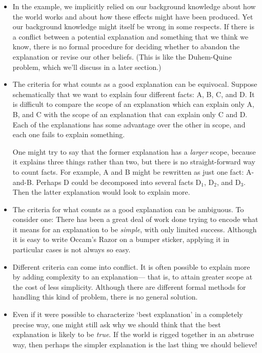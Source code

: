 \documentclass[]{article}
\begin{document}
\begin{itemize}
\item
In the example, we implicitly relied on our background knowledge about how the world works and about how these effects might have been produced. Yet our background knowledge might itself be wrong in some respects. If there is a conflict between a potential explanation and something that we think we know, there is no formal procedure for deciding whether to abandon the explanation or revise our other beliefs. (This is like the Duhem-Quine problem, which we'll discuss in a later section.)
\item
The criteria for what counts as a good explanation can be equivocal. Suppose schematically that we want to explain four different facts: A, B, C, and D. It is difficult to compare the scope of an explanation which can explain only A, B, and C with the scope of an explanation that can explain only C and D. Each of the explanations has some advantage over the other in scope, and each one fails to explain something.

One might try to say that the former explanation has a \emph{larger} scope, because it explains three things rather than two, but there is no straight-forward way to count facts. For example, A and B might be rewritten as just one fact: A-and-B. Perhaps D could be decomposed into several facts D$_{1}$, D$_{2}$, and D$_{3}$. Then the latter explanation would look to explain more.
\item
The criteria for what counts as a good explanation can be ambiguous. To consider one: There has been a great deal of work done trying to encode what it means for an explanation to be \emph{simple}, with only limited success. Although it is easy to write Occam's Razor on a bumper sticker, applying it in particular cases is not always so easy.
\item
Different criteria can come into conflict. It is often possible to explain more by adding complexity to an explanation--- that is, to attain greater scope at the cost of less simplicity. Although there are different formal methods for handling this kind of problem, there is no general solution.
\item
Even if it were possible to characterize `best explanation' in a completely precise way, one might still ask why we should think that the best explanation is likely to be \emph{true}. If the world is rigged together in an abstruse way, then perhaps the simpler explanation is the last thing we should believe!
\end{itemize}
\end{document}
